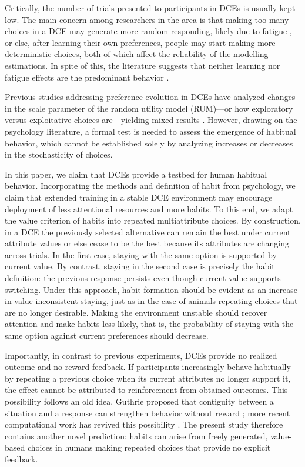 \documentclass[man,natbib,floatsintext]{apa7}
\begin{document}
Critically, the number of trials presented to participants in DCEs is usually kept low. The main concern among researchers in the area is that making too many choices in a DCE may generate more random responding, likely due to fatigue \citep{Bradley1994}, or else, after learning  their own preferences, people may start making more deterministic choices, both of which affect the reliability of the modelling estimations. In spite of this, the literature suggests that neither learning nor fatigue effects are the predominant behavior \citep{campbell2015learning,hess2012not,czajkowski2014learning}.

Previous studies addressing preference evolution in DCEs have analyzed changes in the scale parameter of the random utility model (RUM)---or how exploratory versus exploitative choices are---yielding mixed results \citep{hess2012not}. However, drawing on the psychology literature, a formal test is needed to assess the emergence of habitual behavior, which cannot be established solely by analyzing increases or decreases in the stochasticity of choices.

In this paper, we claim that DCEs provide a testbed for human habitual behavior. Incorporating the methods and definition of habit from psychology, we claim that extended training in a stable DCE environment may encourage deployment of less attentional resources and more habits. To this end, we adapt the value criterion of habits into repeated multiattribute choices. By construction, in a DCE the previously selected alternative can remain the best under current attribute values or else cease to be the best because its attributes are changing across trials. In the first case, staying with the same option is supported by current value. By contrast, staying in the second case is precisely the habit definition: the previous response persists even though current value supports switching. Under this approach, habit formation should be evident as an increase in value-inconsistent staying, just as in the case of animals repeating choices that are no longer desirable. Making the environment unstable should recover attention and make habits less likely, that is, the probability of staying with the same option against current preferences should decrease.  

Importantly, in contrast to previous experiments, DCEs provide no realized outcome and no reward feedback. If participants  increasingly behave habitually by repeating a previous choice when its current attributes no longer support it, the effect cannot be attributed to reinforcement from obtained outcomes. This possibility follows an old idea. Guthrie proposed that contiguity between a situation and a response can strengthen behavior without reward \citep{guthrie1935}; more recent computational work has revived this possibility \citep{millerHabits2019,nebe2024,thorndike1911edward}. The present study therefore contains another novel prediction: habits can arise from freely generated, value-based choices in humans making repeated choices that provide no explicit feedback.
\end{document}
